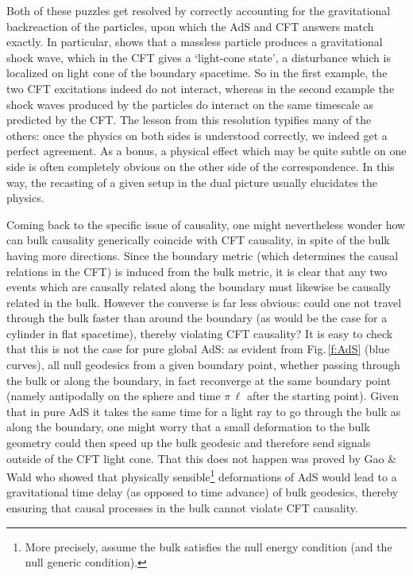 \documentclass[12pt,a4paper]{article}
\def\fig#1{Fig.\,\ref{#1}}
\def\Rads{\ell}
\begin{document}
Both of these puzzles get resolved by correctly accounting for the gravitational backreaction of the particles, upon which the AdS and CFT answers match exactly.  In particular, \cite{Horowitz:1999gf} shows that a massless particle produces a gravitational shock wave, which in the CFT
gives a `light-cone state', a disturbance which is localized on light cone of the boundary spacetime.  
So in the first example, the two CFT excitations indeed do not interact, whereas in the second example the shock waves produced by the particles do interact on the same timescale as predicted by the CFT.
The lesson from this resolution typifies many of the others: once the physics on both sides is understood correctly, we indeed get a perfect agreement.  As a bonus, a physical effect which may be quite subtle on one side is often completely obvious on the other side of the correspondence.   In this way, the recasting of a given setup in the dual picture usually elucidates the physics.

Coming back to the specific issue of causality, one might nevertheless wonder how can bulk causality generically coincide with CFT causality, in spite of  the bulk having more directions.
Since the boundary metric (which determines the causal relations in the CFT) is induced from the bulk metric, it is clear that any two events which are causally related along the boundary must likewise be causally related in the bulk.  However the converse is far less obvious:  could one not travel through the bulk faster than around the boundary (as would be the case for a cylinder in flat spacetime), thereby violating CFT causality?  It is easy to check that this is not the case for pure global AdS: as evident from \fig{f:AdS} (blue curves), all null geodesics from a given boundary point, whether passing through the bulk or along the boundary,  in fact reconverge at the same boundary point (namely antipodally on the sphere and time $\pi \, \Rads$ after the starting point). 
Given that in pure AdS it takes the same time for a light ray to go through the bulk as along the boundary, one might worry that a small deformation to the bulk geometry could then speed up the bulk geodesic and therefore send signals outside of the CFT light cone.
That this does not happen was proved by Gao \& Wald \cite{Gao:2000ga} who showed that physically sensible\footnote{
More precisely, \cite{Gao:2000ga} assume the bulk satisfies the null energy condition (and the null generic condition).
} deformations of AdS would lead to a gravitational time delay (as opposed to time advance) of bulk geodesics, thereby ensuring that causal processes in the bulk cannot violate CFT causality.
\end{document}
